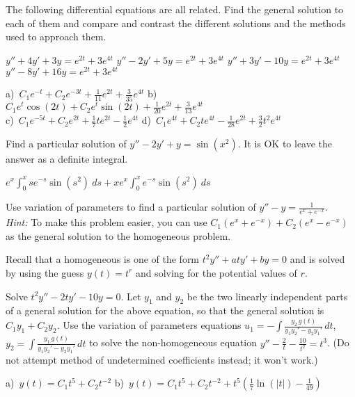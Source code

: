 \begin{exercise}
The following differential equations are all related. Find the general solution to each of them and compare and contrast the different solutions and the methods used to approach them.
\begin{tasks}
\task $y'' + 4y' + 3y = e^{2t} + 3e^{4t}$ 
\task $y'' - 2y' + 5y = e^{2t} + 3e^{4t}$
\task $y'' + 3y' - 10y = e^{2t} + 3e^{4t}$
\task $y'' - 8y'  + 16y = e^{2t} + 3e^{4t}$
\end{tasks}
\end{exercise}
\comboSol{%
}
{%
a)~$C_1e^{-t} + C_2e^{-3t} + \frac{1}{11}e^{2t} + \frac{3}{35}e^{4t}$ \quad b)~$C_1e^{t}\cos(2t) + C_2e^t\sin(2t) + \frac{1}{20}e^{2t} + \frac{3}{13}e^{4t}$ \\ c)~$C_1e^{-5t} + C_2e^{2t} + \frac{1}{7}te^{2t} - \frac{1}{2}e^{4t}$ \quad d)~$C_1e^{4t} + C_2te^{4t} - \frac{1}{28}e^{2t} + \frac{3}{2}t^2e^{4t}$
}

\begin{exercise}
Find a particular solution of
$y''-2y' +y = \sin (x^2)$.  It is OK to leave the answer as a definite
integral.
\end{exercise}
\comboSol{%
}
{%
$e^x\int_0^x se^{-s}\sin(s^2)\ ds + xe^x\int_0^xe^{-s}\sin(s^2)\ ds$
}

\begin{exercise}
Use variation of parameters to
find a particular solution of $y''-y = \frac{1}{e^x+e^{-x}}$. \\ \textit{Hint:} To make this problem easier, you can use $C_1 (e^x + e^{-x}) + C_2 (e^{x} - e^{-x})$ as the general solution to the homogeneous problem. 
\end{exercise}

\begin{exercise}
Recall that a homogeneous \emph{} is one of the form $t^2y'' + aty' + by = 0$ and is solved by using the guess $y(t) = t^r$ and solving for the potential values of $r$. 
\begin{tasks}
\task Solve $t^2y''-2ty'-10y=0$. %
\task Let $y_1$ and $y_2$ be the two linearly independent parts of a general solution for the above equation, so that the general solution is $C_1y_1 + C_2y_2$. Use the variation of parameters equations $\displaystyle u_1=-\int \frac{y_2\, g(t)}{y_1y_2' - y_2y_1'}\,dt$, $\displaystyle y_2=\int \frac{y_1\, g(t)}{y_1y_2' - y_2y_1'}\,dt$ to solve the non-homogeneous equation $\displaystyle y''-\frac{2}{t} - \frac{10}{t^2}=t^3$. \hfill\break (Do not attempt method of undetermined coefficients instead; it won't work.)
\end{tasks}
\end{exercise}
\comboSol{%
}
{%
a)~$y(t) = C_1t^5 + C_2t^{-2}$ \quad
b)~$y(t) = C_1t^5 + C_2t^{-2} + t^5\left(\frac{1}{7}\ln(|t|) - \frac{1}{49}\right)$
}

